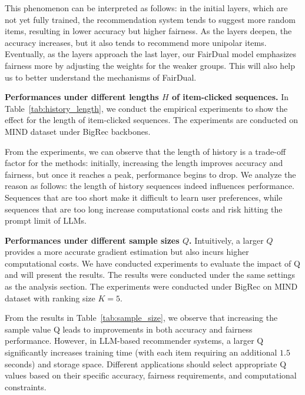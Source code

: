 This phenomenon can be interpreted as follows: in the initial layers, which are not yet fully trained, the recommendation system tends to suggest more random items, resulting in lower accuracy but higher fairness. As the layers deepen, the accuracy increases, but it also tends to recommend more unipolar items. Eventually, as the layers approach the last layer, our FairDual model emphasizes fairness more by adjusting the weights for the weaker groups. This will also help us to better understand the mechanisms of FairDual.





\textbf{Performances under different lengths $H$ of item-clicked sequences.} In Table~\ref{tab:history_length}, we conduct the empirical experiments to show the effect for the length of item-clicked sequences. The experiments are conducted on MIND dataset under BigRec backbones. 

From the experiments, we can observe that the length of history is a trade-off factor for the methods: initially, increasing the length improves accuracy and fairness, but once it reaches a peak, performance begins to drop. We analyze the reason as follows: the length of history sequences indeed influences performance. Sequences that are too short make it difficult to learn user preferences, while sequences that are too long increase computational costs and risk hitting the prompt limit of LLMs.





\textbf{Performances under different sample sizes $Q$.} Intuitively, a larger $Q$ provides a more accurate gradient estimation but also incurs higher computational costs. We have conducted experiments to evaluate the impact of Q and will present the results. The results were conducted under the same settings as the analysis section. The experiments were conducted under BigRec on MIND dataset with ranking size $K=5$.




From the results in Table~\ref{tab:sample_size}, we observe that increasing the sample value Q leads to improvements in both accuracy and fairness performance. However, in LLM-based recommender systems, a larger Q significantly increases training time (with each item requiring an additional $1.5$ seconds) and storage space. Different applications should select appropriate Q values based on their specific accuracy, fairness requirements, and computational constraints.





